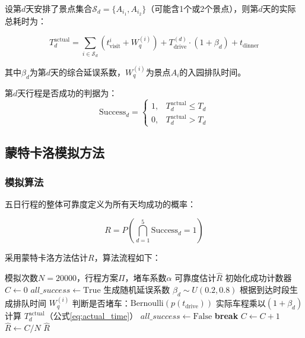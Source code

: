 \documentclass[12pt,a4paper]{ctexart}
\begin{document}
设第$d$天安排了景点集合$\mathcal{S}_d = \{A_{i_1}, A_{i_2}\}$（可能含1个或2个景点），则第$d$天的实际总耗时为：

\begin{equation}
\label{eq:actual_time}
T_d^{\text{actual}} = \sum_{i \in \mathcal{S}_d} \left( t_{\text{visit}}^i + W_q^{(i)} \right) + T_{\text{drive}}^{(d)} \cdot (1 + \beta_d) + t_{\text{dinner}}
\end{equation}

其中$\beta_d$为第$d$天的综合延误系数，$W_q^{(i)}$为景点$A_i$的入园排队时间。

第$d$天行程是否成功的判据为：
\begin{equation}
\label{eq:success}
\text{Success}_d = \begin{cases}
1, & T_d^{\text{actual}} \le T_d \\
0, & T_d^{\text{actual}} > T_d
\end{cases}
\end{equation}

\subsection{蒙特卡洛模拟方法}

\subsubsection{模拟算法}

五日行程的整体可靠度定义为所有天均成功的概率：

\begin{equation}
\label{eq:reliability}
R = P\left(\bigcap_{d=1}^{5} \text{Success}_d = 1\right)
\end{equation}

采用蒙特卡洛方法估计$R$，算法流程如下：

\begin{algorithm}[H]
\caption{蒙特卡洛行程可靠度模拟}
\label{alg:mc}
\begin{algorithmic}[1]
\REQUIRE 模拟次数$N=20000$，行程方案$\Pi$，堵车系数$\alpha$
\ENSURE 可靠度估计$\hat{R}$
\STATE 初始化成功计数器 $C \leftarrow 0$
    \STATE $all\_success \leftarrow \text{True}$
        \STATE 生成随机延误系数 $\beta_d \sim U(0.2, 0.8)$
            \STATE 根据到达时段生成排队时间 $W_q^{(i)}$
            \STATE 判断是否堵车：$\text{Bernoulli}(p(t_{\text{drive}}))$
                \STATE 实际车程乘以$(1+\beta_d)$
            \ENDIF
        \ENDFOR
        \STATE 计算 $T_d^{\text{actual}}$（公式\eqref{eq:actual_time}）
            \STATE $all\_success \leftarrow \text{False}$
            \STATE \textbf{break}
        \ENDIF
    \ENDFOR
        \STATE $C \leftarrow C + 1$
    \ENDIF
\ENDFOR
\STATE $\hat{R} \leftarrow C / N$
\RETURN $\hat{R}$
\end{algorithmic}
\end{algorithm}
\end{document}
